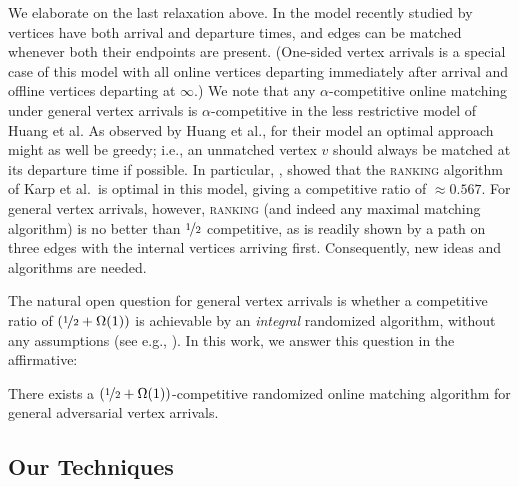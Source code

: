 We elaborate on the last relaxation above. In the model recently studied by \citet{huang2018match,huang2019tight} vertices have both arrival and departure times, and edges can be matched whenever both their endpoints are present. (One-sided vertex arrivals is a special case of this model with all online vertices departing immediately after arrival and offline vertices departing at $\infty$.) 
We note that any $\alpha$-competitive online matching under general vertex arrivals is $\alpha$-competitive in the less restrictive model of Huang et al.
As observed by Huang et al., for their model an optimal approach might as well be greedy; i.e., an unmatched vertex $v$ should always be matched at its departure time if possible. In particular, \citet{huang2018match,huang2019tight}, showed that the \textsc{ranking}  algorithm of Karp et al.~is optimal in this model, giving a competitive ratio of $\approx 0.567$.
For general vertex arrivals, however, \textsc{ranking} (and indeed any maximal matching algorithm) is no better than $\nicefrac{1}{2}$ competitive, as is readily shown by a path on three edges with the internal vertices arriving first. Consequently, new ideas and algorithms are needed.

The  natural open question for general vertex arrivals is whether a competitive ratio of $(\nicefrac{1}{2}+\Omega(1))$ is achievable by an \emph{integral} randomized algorithm, without any assumptions (see e.g., \cite{wang2015two}).
In this work, we answer this question in the affirmative: 

\begin{thm}\label{thm:vertex-intro}
	There exists a $\left(\nicefrac{1}{2}+\Omega(1)\right)$-competitive randomized online matching algorithm for 
	general adversarial vertex arrivals.
\end{thm}

\subsection{Our Techniques}
\label{sec:techniques}

